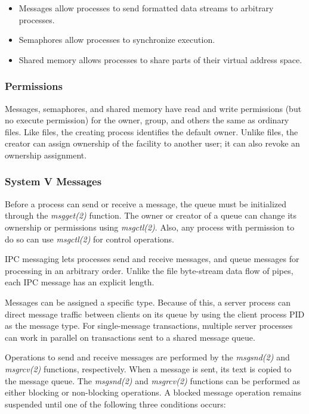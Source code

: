 \documentclass[12pt]{article}
\begin{document}
\begin{itemize}
	\item Messages allow processes to send formatted data streams to arbitrary processes.
	
	
	\item Semaphores allow processes to synchronize execution.
		
	\item Shared memory allows processes to share parts of their virtual address space.

\end{itemize}	


\subsubsection{Permissions}

Messages, semaphores, and shared memory have read and write permissions (but no execute permission) for the owner, group, and others the same as ordinary files. Like files, the creating process identifies the default owner. Unlike files, the creator can assign ownership of the facility to another user; it can also revoke an ownership assignment.

\subsubsection{System V Messages}

Before a process can send or receive a message, the queue must be initialized through the \emph{msgget(2)} function. The owner or creator of a queue can change its ownership or permissions using  \emph{msgctl(2)}. Also, any process with permission to do so can use \emph{msgctl(2)} for control operations.

IPC messaging lets processes send and receive messages, and queue messages for processing in an arbitrary order. Unlike the file byte-stream data flow of pipes, each IPC message has an explicit length.

Messages can be assigned a specific type. Because of this, a server process can direct message traffic between clients on its queue by using the client process PID as the message type. For single-message transactions, multiple server processes can work in parallel on transactions sent to a shared message queue.

Operations to send and receive messages are performed by the \emph{msgsnd(2)} and \emph{msgrcv(2) }functions, respectively. When a message is sent, its text is copied to the message queue. The \emph{msgsnd(2)} and \emph{msgrcv(2)} functions can be performed as either blocking or non-blocking operations. A blocked message operation remains suspended until one of the following three conditions occurs:
\end{document}
